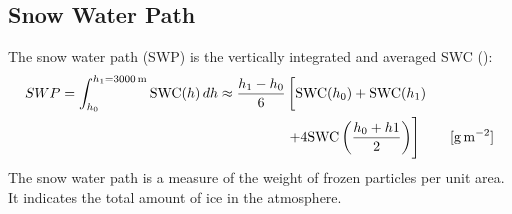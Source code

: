 \subsection{Snow Water Path}\label{sec:SWP}
The snow water path (SWP) is the vertically integrated and averaged SWC (): %
\begin{equation}
\begin{split}
SWP = \int_{h_0}^{h_1=\SI{3000}{\metre}} \text{SWC}(h) \, dh \approx 
\frac{h_1 - h_0}{6}  & \left[ \text{SWC}(h_0)    + \text{SWC}(h_1)   \vphantom{\frac{h_0 + h_1}{2}} \right. \\ 
& \left. + 4 \text{SWC}\left(\frac{h_0 + h1}{2}\right)  
\right] \qquad [\SI{}{\g\per\square\meter}]
\end{split}
\label{eq:SWP}
\end{equation}
The snow water path is a measure of the weight of frozen particles per unit area. It indicates the total amount of ice in the atmosphere.
